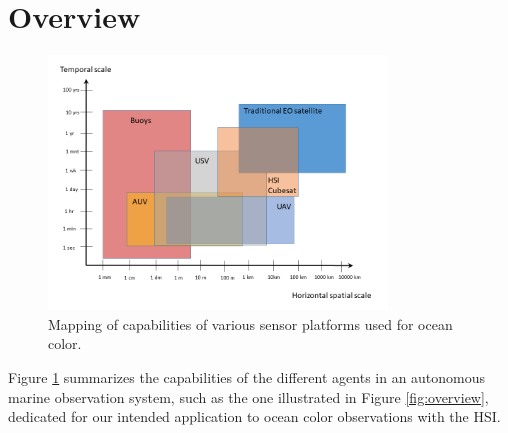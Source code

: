 \section{Overview}

\begin{figure}[tbhp]
  \begin{center}
    \includegraphics[width=90mm,angle=0]{figs/scales.png}
    \caption{Mapping of capabilities of various sensor platforms used for ocean color.}
    \label{fig:scales}
\end{center}
\end{figure}

Figure \ref{fig:scales} summarizes the capabilities of the different
agents in an autonomous marine observation system, such as the one
illustrated in Figure \ref{fig:overview}, dedicated for our intended
application to ocean color observations with the HSI.  

